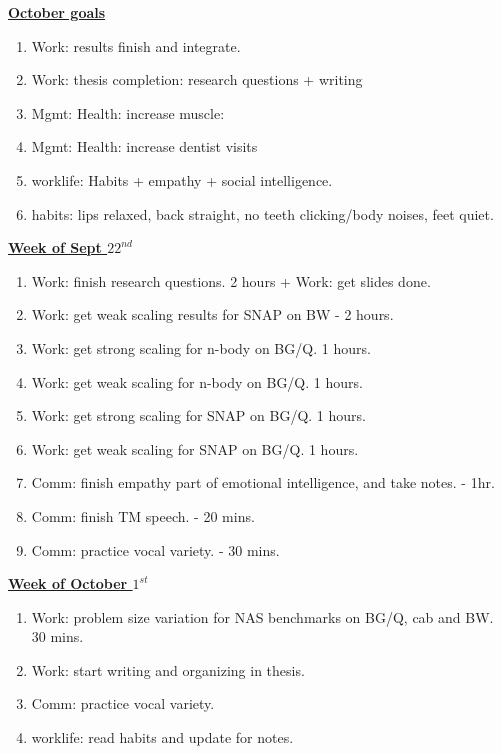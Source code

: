 \underline{\textbf{October goals}}\\
\begin{enumerate}
\item Work: results finish and integrate. 
\item Work: thesis completion: research questions + writing 
\item Mgmt: Health: increase muscle: 
\item Mgmt: Health: increase dentist visits 
\item worklife: Habits + empathy + social intelligence. 
\item habits: lips relaxed, back straight, no teeth clicking/body noises, feet quiet. 
\end{enumerate}

\underline{\textbf{Week of Sept $22^{nd}$}} \\

\begin{enumerate}

\item Work: finish research questions. 2 hours +  Work: get slides done. 

\item Work: get weak scaling results for SNAP on BW - 2 hours. 
\item Work: get strong scaling for n-body on BG/Q. 1 hours.
\item Work: get weak scaling for n-body on BG/Q. 1 hours.
\item Work: get strong scaling for SNAP on BG/Q. 1 hours.
\item Work: get weak scaling for SNAP on BG/Q. 1 hours. 

\item Comm: finish empathy part of emotional intelligence, and take notes. - 1hr. 
\item Comm: finish TM speech. - 20 mins. 
\item Comm: practice vocal variety. - 30 mins. 
\end{enumerate}

\underline{\textbf{Week of October $1^{st}$}} \\
\begin{enumerate}
\item Work: problem size variation for NAS benchmarks on BG/Q, cab and BW. 30 mins. 
\item Work: start writing and organizing in thesis. 

\item Comm: practice vocal variety. 
\item worklife: read habits and update for notes. 
\end{enumerate} 

